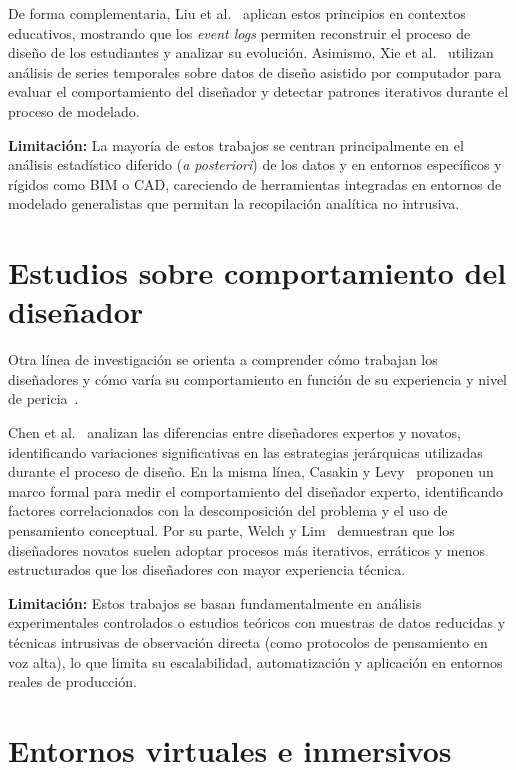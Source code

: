 De forma complementaria, Liu et al.~\cite{liu2022} aplican estos principios en contextos educativos, mostrando que los \textit{event logs} permiten reconstruir el proceso de diseño de los estudiantes y analizar su evolución. Asimismo, Xie et al.~\cite{xie2014} utilizan análisis de series temporales sobre datos de diseño asistido por computador para evaluar el comportamiento del diseñador y detectar patrones iterativos durante el proceso de modelado.

\textbf{Limitación:} La mayoría de estos trabajos se centran principalmente en el análisis estadístico diferido (\textit{a posteriori}) de los datos y en entornos específicos y rígidos como BIM o CAD, careciendo de herramientas integradas en entornos de modelado generalistas que permitan la recopilación analítica no intrusiva.

\section{Estudios sobre comportamiento del diseñador}

Otra línea de investigación se orienta a comprender cómo trabajan los diseñadores y cómo varía su comportamiento en función de su experiencia y nivel de pericia~\cite{casakin2023,chen2022,welch}.

Chen et al.~\cite{chen2022} analizan las diferencias entre diseñadores expertos y novatos, identificando variaciones significativas en las estrategias jerárquicas utilizadas durante el proceso de diseño. En la misma línea, Casakin y Levy~\cite{casakin2023} proponen un marco formal para medir el comportamiento del diseñador experto, identificando factores correlacionados con la descomposición del problema y el uso de pensamiento conceptual. Por su parte, Welch y Lim~\cite{welch} demuestran que los diseñadores novatos suelen adoptar procesos más iterativos, erráticos y menos estructurados que los diseñadores con mayor experiencia técnica.

\textbf{Limitación:} Estos trabajos se basan fundamentalmente en análisis experimentales controlados o estudios teóricos con muestras de datos reducidas y técnicas intrusivas de observación directa (como protocolos de pensamiento en voz alta), lo que limita su escalabilidad, automatización y aplicación en entornos reales de producción.

\section{Entornos virtuales e inmersivos}

